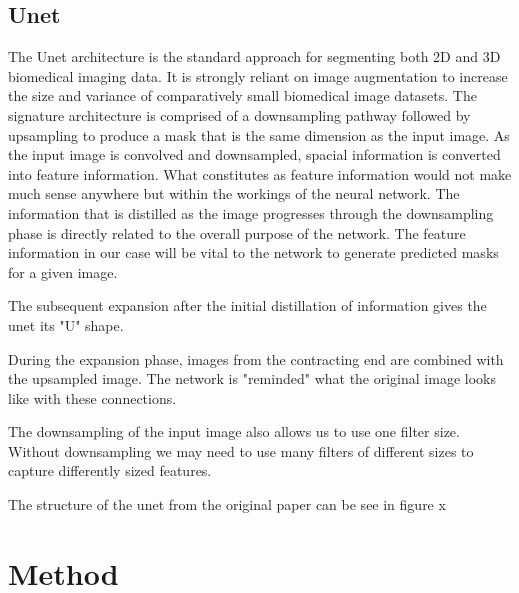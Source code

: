 \documentclass[12pt]{article}
\begin{document}
\subsection{Unet}
The Unet architecture is the standard approach for segmenting both 2D and 3D biomedical imaging data.
It is strongly reliant on image augmentation to increase the size and variance of comparatively small biomedical image datasets.
The signature architecture is comprised of a downsampling pathway followed by upsampling to produce a mask that is the same dimension as the input image.
As the input image is convolved and downsampled, spacial information is converted into feature information.
What constitutes as feature information would not make much sense anywhere but within the workings of the neural network.
The information that is distilled as the image progresses through the downsampling phase is directly related to the overall purpose of the network. 
The feature information in our case will be vital to the network to generate predicted masks for a given image.

The subsequent expansion after the initial distillation of information gives the unet its "U" shape.

During the expansion phase, images from the contracting end are combined with the upsampled image.
The network is "reminded" what the original image looks like with these connections.

The downsampling of the input image also allows us to use one filter size.
Without downsampling we may need to use many filters of different sizes to capture differently sized features.

The structure of the unet from the original paper can be see in figure x


\section{Method}
\end{document}

